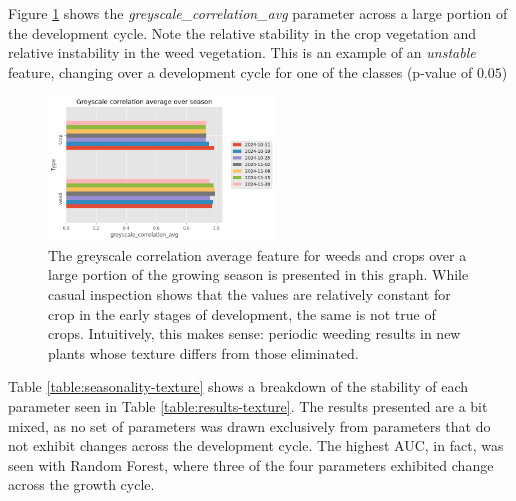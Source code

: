 \documentclass[letterpaper]{report}
\begin{document}
Figure \ref{fig:season-texture-correlation} shows the \textit{greyscale\_correlation\_avg} parameter across a large portion of the development cycle. Note the relative stability in the crop vegetation and relative instability in the weed vegetation. This is an example of an \textit{unstable} feature, changing over a development cycle for one of the classes (p-value of $0.05$)


\begin{figure}[H]
	\centering
	\includegraphics[width=6cm]{./figures/plot-over-season.png}
	\caption[Greyscale Correlation Average over growing season]{The greyscale correlation average feature for weeds and crops over a large portion of the growing season is presented in this graph. While casual inspection shows that the values are relatively constant for crop in the early stages of development, the same is not true of crops. Intuitively, this makes sense: periodic weeding results in new plants whose texture differs from those eliminated.}
	\label{fig:season-texture-correlation}
\end{figure}
 
 Table \ref{table:seasonality-texture} shows a breakdown of the stability of each parameter seen in Table \ref{table:results-texture}. The results presented are a bit mixed, as no set of parameters was drawn exclusively from parameters that do not exhibit changes across the development cycle. The highest AUC, in fact, was seen with Random Forest, where three of the four parameters exhibited change across the growth cycle.
 
 {
\renewcommand{\arraystretch}{1.2}




}
\end{document}
